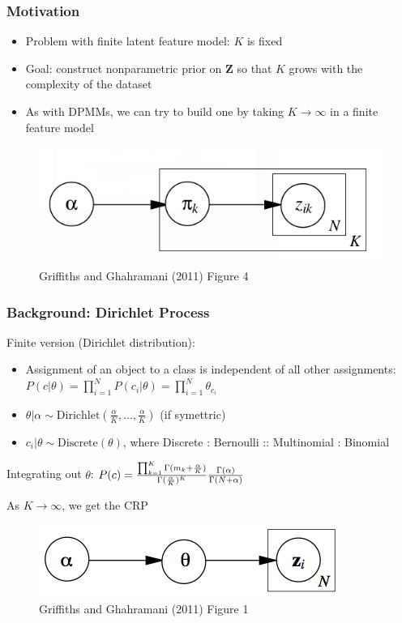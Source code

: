 \documentclass[13pt]{beamer}
\begin{document}
\begin{frame}
\frametitle{Motivation}
\begin{itemize}
\item Problem with finite latent feature model: $K$ is fixed
\item Goal: construct nonparametric prior on $\mathbf{Z}$ so that $K$ grows with the complexity of the dataset
\item As with DPMMs, we can try to build one by taking $K \rightarrow \infty$ in a finite feature model
\end{itemize}

\begin{figure}
\begin{center}
\includegraphics[scale=0.4]{./img/beta-bernoulli.png}
\caption{Griffiths and Ghahramani (2011) Figure 4}
\end{center}
\end{figure}
\end{frame}
\begin{frame}
\frametitle{Background: Dirichlet Process}

Finite version (Dirichlet distribution):
\begin{itemize}
\item Assignment of an object to a class is independent of all other assignments: $P(c|\theta) = \prod_{i=1}^N P(c_i|\theta) = \prod_{i=1}^N \theta_{c_i}$
\item $\theta|\alpha \sim \text{Dirichlet}(\frac{\alpha}{K},\ldots,\frac{\alpha}{K})$ (if symettric)
\item $c_i|\theta \sim \text{Discrete}(\theta)$, where Discrete : Bernoulli :: Multinomial : Binomial
\end{itemize}

Integrating out $\theta$: $P(c) = { \prod_{k=1}^K \Gamma(m_k + \frac{\alpha}{K}) \over \Gamma(\frac{\alpha}{K})^K} {\Gamma(\alpha) \over \Gamma(N+\alpha)}$

As $K \rightarrow \infty$, we get the CRP

\begin{figure}
\begin{center}
\includegraphics[scale=0.3]{./img/crp-graphical-model.png}
\caption{Griffiths and Ghahramani (2011) Figure 1}
\end{center}
\end{figure}

\end{frame}
\end{document}
